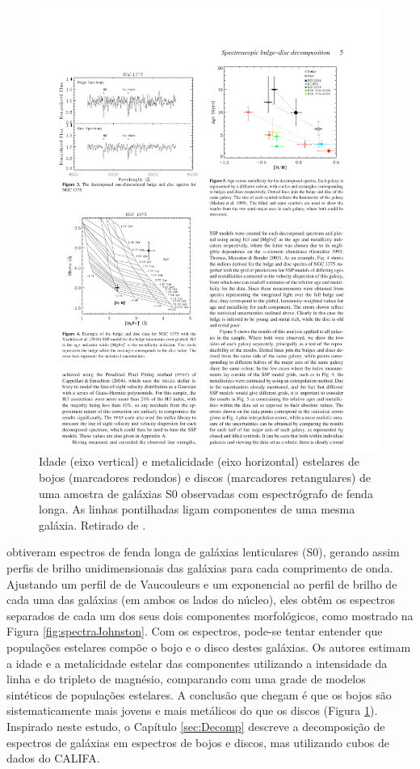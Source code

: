 \begin{figure}
	\includegraphics{figuras/johnston-pop}
	\caption[Idade e metalicidade de bojos e discos de galáxias S0.] {Idade (eixo
	vertical) e metalicidade (eixo horizontal) estelares de bojos (marcadores
	redondos) e discos (marcadores retangulares) de uma amostra de galáxias S0
	observadas com espectrógrafo de fenda longa. As linhas pontilhadas ligam
	componentes de uma mesma galáxia. Retirado de \citet{Johnston2012}.}
	\label{fig:populationJohnston}
\end{figure}

\citet{Johnston2012} obtiveram espectros de fenda longa de galáxias lenticulares
(S0), gerando assim perfis de brilho unidimensionais das galáxias para cada
comprimento de onda. Ajustando um perfil de de Vaucouleurs e um exponencial ao
perfil de brilho de cada uma das galáxias (em ambos os lados do núcleo), eles
obtêm os espectros separados de cada um dos seus dois componentes morfológicos,
como mostrado na Figura \ref{fig:spectraJohnston}. Com os espectros, pode-se
tentar entender que populações estelares compõe o bojo e o disco destes
galáxias. Os autores estimam a idade e a metalicidade estelar das componentes
utilizando a intensidade da linha \Hbeta e do tripleto de magnésio, comparando
com uma grade de modelos sintéticos de populações estelares. A conclusão que
chegam é que os bojos são sistematicamente mais jovens e mais metálicos do que
os discos (Figura \ref{fig:populationJohnston}). Inspirado neste estudo, o
Capítulo \ref{sec:Decomp} descreve a decomposição de espectros de galáxias em
espectros de bojos e discos, mas utilizando cubos de dados do CALIFA.



